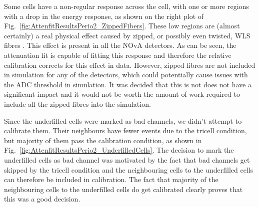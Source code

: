 Some cells have a non-regular response across the cell, with one or more regions with a drop in the energy response, as shown on the right plot of Fig.~\ref{fig:AttenfitResultsPerio2_ZippedFibers}. These low regions are (almost certainly) a real physical effect caused by zipped, or possibly even twisted, \gls{WLS} fibres \cite{NOvA-doc-43249}. This effect is present in all the \gls{NOvA} detectors. As can be seen, the attenuation fit is capable of fitting this response and therefore the relative calibration corrects for this effect in data. However, zipped fibres are not included in simulation for any of the detectors, which could potentially cause issues with the \gls{ADC} threshold in simulation. It was decided that this is not does not have a significant impact and it would not be worth the amount of work required to include all the zipped fibres into the simulation.

Since the underfilled cells were marked as bad channels, we didn't attempt to calibrate them. Their neighbours have fewer events due to the tricell condition, but majority of them pass the calibration condition, as shown in Fig.~\ref{fig:AttenfitResultsPerio2_UnderfilledCells}. The decision to mark the underfilled cells as bad channel was motivated by the fact that bad channels get skipped by the tricell condition and the neighbouring cells to the underfilled cells can therefore be included in calibration. The fact that majority of the neighbouring cells to the underfilled cells do get calibrated clearly proves that this was a good decision.

